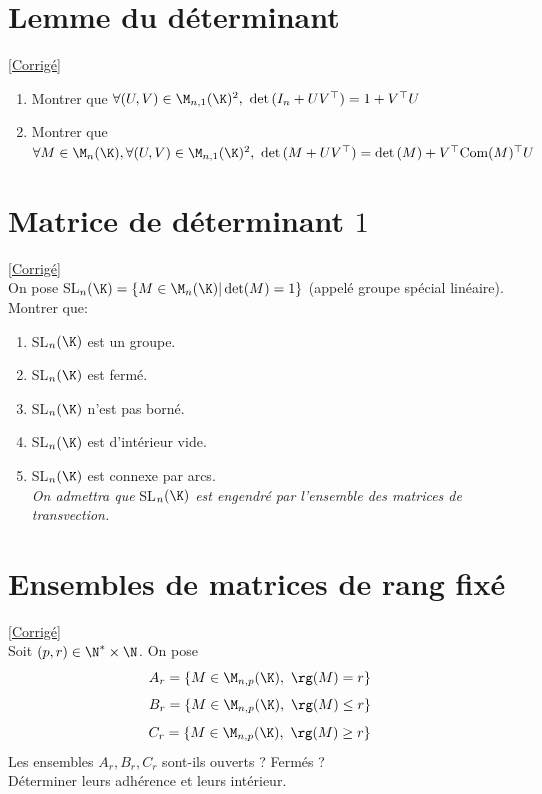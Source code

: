 \documentclass{book}
\begin{document}
\section{Lemme du déterminant}
\label{Lemme du déterminant}
\textcolor{blue}{\hyperref[sec:lemme-du-determinant]{[Corrigé]}}\\
\begin{enumerate}[leftmargin=*]
	\item Montrer que $\forall (U,V)\in \M_{n,1}(\K)^2,\  \det{(I_n+UV^\top)}=1+V^\top U$
	\item Montrer que $\forall M\in \M_n(\K),\forall (U,V)\in \M_{n,1}(\K)^2,\ \det{(M+UV^\top)}=\det{(M)}+V^\top\text{Com}(M)^\top U$
\end{enumerate}

\section{Matrice de déterminant $1$ }
\label{Matrice de déterminant 1}
\textcolor{blue}{\hyperref[sec:matrice-de-determinant-1-etoile3]{[Corrigé]}}\\
On pose SL$_n(\K)=\{M\in\M_n(\K)|\det(M)=1\}$ (appelé groupe spécial linéaire).\\
Montrer que: 
\begin{enumerate}
	\item SL$_n(\K)$ est un groupe.
	\item SL$_n(\K)$ est fermé.
	\item SL$_n(\K)$ n'est pas borné.
	\item SL$_n(\K)$ est d'intérieur vide.
	\item SL$_n(\K)$ est connexe par arcs.\\
	\textit{On admettra que} SL$_n(\K)$ \textit{est engendré par l'ensemble des matrices de transvection.}
\end{enumerate}

\section{Ensembles de matrices de rang fixé}
\label{Ensembles de matroces de rang fixé}
\textcolor{blue}{\hyperref[sec:ensembles-de-matrices-de-rang-fixe]{[Corrigé]}}\\
Soit $(p,r)\in \N^*\times \N$. On pose
$$A_r=\{M\in\M_{n,p}(\K),\ \rg(M)=r\}$$
$$B_r=\{M\in\M_{n,p}(\K),\ \rg(M)\leq r\}$$
$$C_r=\{M\in\M_{n,p}(\K),\ \rg(M)\geq r\}$$
Les ensembles $A_r,B_r,C_r$ sont-ils ouverts ? Fermés ?\\
Déterminer leurs adhérence et leurs intérieur.
\end{document}
